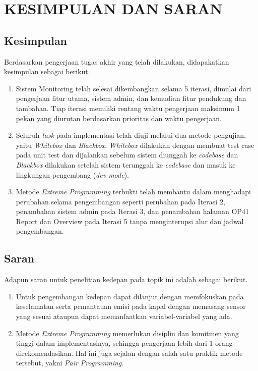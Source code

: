
\chapter{KESIMPULAN DAN SARAN}


\section{Kesimpulan}
Berdasarkan pengerjaan tugas akhir yang telah dilakukan, didapakatkan kesimpulan sebagai berikut.

\begin{enumerate}
    \item Sistem Monitoring telah selesai dikembangkan selama 5 iterasi, dimulai dari pengerjaan fitur utama, sistem admin, dan kemudian fitur pendukung dan tambahan. Tiap iterasi memiliki rentang waktu pengerjaan maksimum 1 pekan yang diurutan berdasarkan prioritas dan waktu pengerjaan.
    \item Seluruh \textit{task} pada implementasi telah diuji melalui dua metode pengujian, yaitu \textit{Whitebox} dan \textit{Blackbox}. \textit{Whitebox} dilakukan dengan membuat test case pada unit test dan dijalankan sebelum sistem diunggah ke \textit{codebase} dan \textit{Blackbox} dilakukan setelah sistem terunggah ke \textit{codebase} dan masuk ke lingkungan pengembang (\textit{dev mode}).
    \item Metode \textit{Extreme Programming} terbukti telah membantu dalam menghadapi perubahan selama pengembangan seperti perubahan pada Iterasi 2, penambahan sistem admin pada Iterasi 3, dan penambahan halaman OP41 Report dan Overview pada Iterasi 5 tanpa menginterupsi alur dan jadwal pengembangan.
\end{enumerate}

\section{Saran}

Adapun saran untuk penelitian kedepan pada topik ini adalah sebagai berikut.

\begin{enumerate}
    \item Untuk pengembangan kedepan dapat dilanjut dengan memfokuskan pada keselamatan serta pemantauan emisi pada kapal dengan memasang sensor yang sesuai ataupun dapat memanfaatkan variabel-variabel yang ada.
    \item Metode \textit{Extreme Programming} memerlukan disiplin dan komitmen yang tinggi dalam implementasinya, sehingga pengerjaan lebih dari 1 orang direkomendasikan. Hal ini juga sejalan dengan salah satu praktik metode tersebut, yakni \textit{Pair Programming}.
\end{enumerate}